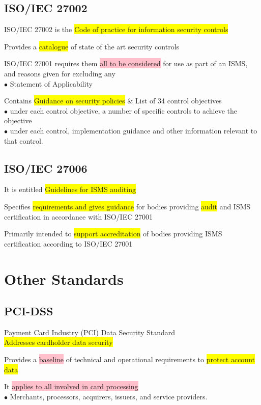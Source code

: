 \documentclass[tikz,border=10pt]{project_plan}
\newcommand{\bulletPoint}{\hspace{-3.1pt}$\bullet$ \hspace{5pt}}
\begin{document}
\subsection{ISO/IEC 27002}
ISO/IEC 27002 is the \colorbox{yellow}{Code of practice for information security controls}

Provides a \colorbox{yellow}{catalogue} of state of the art security controls

ISO/IEC 27001 requires them \colorbox{pink}{all to be considered} for use as part of an ISMS, and reasons given for excluding any\\
\bulletPoint Statement of Applicability

Contains \colorbox{yellow}{Guidance on security policies} \& List of 34 control objectives\\
\bulletPoint under each control objective, a number of specific controls to achieve the objective\\
\bulletPoint under each control, implementation guidance and other information relevant to that control.

\subsection{ISO/IEC 27006}
It is entitled \colorbox{yellow}{Guidelines for ISMS auditing}

Specifies \colorbox{yellow}{requirements and gives guidance} for bodies providing \colorbox{yellow}{audit} and ISMS certification in accordance with ISO/IEC 27001

Primarily intended to \colorbox{yellow}{support accreditation} of bodies providing ISMS certification according to ISO/IEC 27001

\section{Other Standards}

\subsection{PCI-DSS}
Payment Card Industry (PCI) Data Security Standard\\
\colorbox{yellow}{Addresses cardholder data security}

Provides a \colorbox{pink}{baseline} of technical and operational requirements to \colorbox{yellow}{protect account data}

It \colorbox{pink}{applies to all involved in card processing}\\
\bulletPoint Merchants, processors, acquirers, issuers, and service providers.
\end{document}
